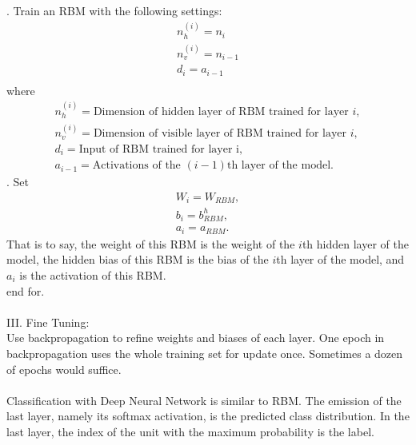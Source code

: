 \documentclass[12pt]{article}
\begin{document}
. Train an RBM with the following settings:\\
\begin{gather}
n_h^{(i)}=n_i\\
n_v^{(i)}=n_{i-1}\\
d_i=a_{i-1}\\
\end{gather}
\indent where
\begin{gather}
n_h^{(i)} = \text{Dimension of hidden layer of RBM trained for layer }i,\\
n_v^{(i)} = \text{Dimension of visible layer of RBM trained for layer }i,\\
d_i = \text{Input of RBM trained for layer i},\\
a_{i-1} = \text{Activations of the }(i-1)\text{th layer of the model}.
\end{gather}
. Set \begin{gather}
W_i = W_{RBM},\\
b_i = b^h_{RBM},\\
a_i = a_{RBM}.
\end{gather}
\indent That is to say, the weight of this RBM is the weight of the $i$th hidden layer of the model, the hidden bias of this RBM is the bias of the $i$th layer of the model, and $a_i$ is the activation of this RBM.\\
end for.\\
\\
III. Fine Tuning:\\
Use backpropagation to refine weights and biases of each layer. One epoch in backpropagation uses the whole training set for update once. Sometimes a dozen of epochs would suffice.\\
\\
Classification with Deep Neural Network is similar to RBM. The emission of the last layer, namely its softmax activation, is the predicted class distribution. In the last layer, the index of the unit with the maximum probability is the label. 
\end{document}
